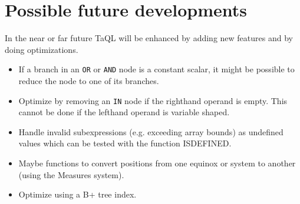 \section{Possible future developments}
In the near or far future TaQL will be enhanced by adding new
features and by doing optimizations.
\begin{itemize}
  \item If a branch in an \texttt{OR} or \texttt{AND} node is a
    constant scalar, it might be possible to reduce the node to
    one of its branches.
  \item Optimize by removing an \texttt{IN} node if the righthand
    operand is empty. This cannot be done if the lefthand operand
    is variable shaped.
  \item Handle invalid subexpressions (e.g. exceeding array bounds)
    as undefined values
    which can be tested with the function ISDEFINED.
  \item Maybe functions to convert positions from one equinox or system
       to another (using the Measures system).
  \item Optimize using a B+ tree index.
\end{itemize}

